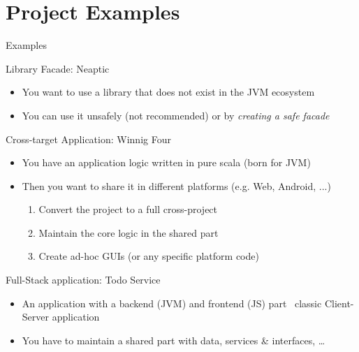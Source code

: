 \documentclass[presentation, 9pt]{beamer}\mode<presentation>{\usetheme{AMSBolognaFC}}
\begin{document}
\section{Project Examples}

\begin{frame}{Examples}
	\begin{alertblock}{Library Facade: Neaptic \href{https://github.com/unibo-pps/scala-js-facade-example}{\faLink}}
		\begin{itemize}
			\item You want to use a library that does not exist in the JVM ecosystem
   		\item You can use it unsafely (not recommended) or by \emph{creating a safe facade}
		\end{itemize}
	\end{alertblock}
	\begin{alertblock}{Cross-target Application: Winnig Four \href{https://github.com/unibo-pps/scala-cross-platform-winning-four}{\faLink}}
		\begin{itemize}
			\item You have an application logic written in pure scala (born for JVM)
			\item Then you want to share it in different platforms (e.g. Web, Android, ...)
   		\begin{enumerate}
				 \item Convert the project to a full cross-project
     		 \item Maintain the core logic in the shared part
         \item Create ad-hoc GUIs (or any specific platform code)
			 \end{enumerate} 
		\end{itemize}
	\end{alertblock}
	\begin{alertblock}{Full-Stack application: Todo Service \href{https://github.com/unibo-pps/scala-full-stack-app}{\faLink}}
		\begin{itemize}
			\item An application with a backend (JVM) and frontend (JS) part \faArrowRight \, classic Client-Server application
   		\item You have to maintain a shared part with data, services \& interfaces, \dots 
		\end{itemize}
	\end{alertblock}
\end{frame}
\end{document}
